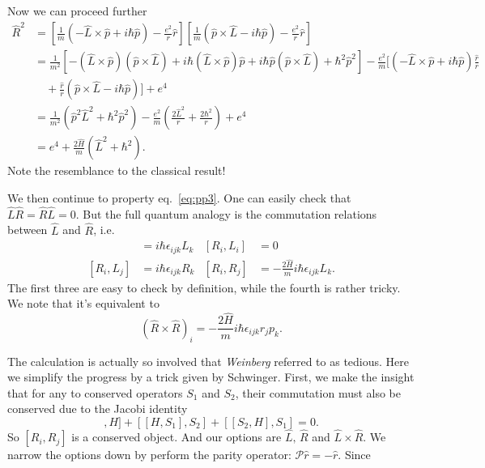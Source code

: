 \documentclass[a4paper,11pt]{article}
\theoremstyle{remark}
\theoremstyle{defn}
\begin{document}
Now we can proceed further
\begin{equation}
\begin{split}
\hat{R}^2 
&=[\frac{1}{m}(-\hat{L}\times\hat{p}+i\hbar\hat{p})-\frac{e^2}{r}\hat{r}]
[\frac{1}{m}(\hat{p}\times\hat{L}-i\hbar\hat{p})-\frac{e^2}{r}\hat{r}]\\
&=\frac{1}{m^2}[-(\hat{L}\times\hat{p})(\hat{p}\times\hat{L}) + i\hbar(\hat{L}\times\hat{p})\hat{p} + i\hbar\hat{p}(\hat{p}\times\hat{L}) + \hbar^2\hat{p}^2]
 -\frac{e^2}{m}[(-\hat{L}\times\hat{p}+i\hbar\hat{p})\frac{\hat{r}}{r} \\
 &\quad + \frac{\hat{r}}{r}(\hat{p}\times\hat{L}-i\hbar\hat{p})]+e^4\\
&=\frac{1}{m^2}(\hat{p}^2\hat{L}^2+\hbar^2\hat{p}^2)-\frac{e^2}{m}(\frac{2\hat{L}^2}{r}+\frac{2\hbar^2}{r})+e^4\\
&=e^4+\frac{2\hat{H}}{m}(\hat{L}^2+\hbar^2).
\end{split}
\end{equation}
Note the resemblance to the classical result!\par 
We then continue to property eq.~\eqref{eq:pp3}. One can easily check that $\hat{L}\hat{R}=\hat{R}\hat{L}=0$.
But the full quantum analogy is the commutation relations between $\hat{L}$ and $\hat{R}$, i.e.
\begin{align}
[L_i,L_j]&=i\hbar\epsilon_{ijk}L_k   &  [R_i,L_i]&=0\\
[R_i,L_j]&=i\hbar\epsilon_{ijk}R_k   &  [R_i,R_j]&=-\frac{2\hat{H}}{m}i\hbar\epsilon_{ijk}L_k.
\end{align}
The first three are easy to check by definition, while the fourth is rather tricky. We note that it's equivalent to 
\begin{equation}
(\hat{R}\times\hat{R})_i = -\frac{2\hat{H}}{m}i\hbar\epsilon_{ijk}r_jp_k.
\end{equation}
\par The calculation is actually so involved that \textit{Weinberg} referred to as tedious. Here we simplify the progress by a 
trick given by Schwinger. First, we make the insight that for any to conserved operators $S_1$ and $S_2$, their commutation must
also be conserved due to the Jacobi identity
\begin{equation}
[[S_1,S_2],H]+[[H,S_1],S_2]+[[S_2,H],S_1]=0.
\end{equation}
So $[R_i,R_j]$ is a conserved object. And our options are $\hat{L},\,\hat{R}$ and $\hat{L}\times\hat{R}$.
We narrow the options down by perform the parity operator: $\mathcal{P}\hat{r}=-\hat{r}$. Since
\end{document}
